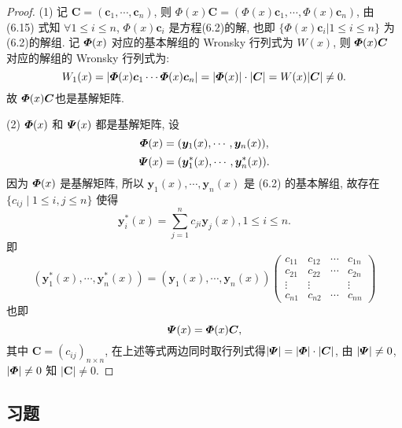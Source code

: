 \begin{proof}
(1) 记 $\bm{C}=(\bm{c}_1,\cdots,\bm{c}_n)$,
则 $\bm{\varPhi}(x)\bm{C}=(\bm{\varPhi}(x)\bm{c}_1,\cdots,\bm{\varPhi}(x)\bm{c}_n)$,
由 (6.15) 式知 $\forall 1\leq i\leq n$, $\bm{\varPhi}(x)\bm{c}_i$ 是方程(6.2)的解,
也即 $\{\bm{\varPhi}(x)\bm{c}_i|1\leq i\leq n\}$ 为(6.2)的解组.
记 $\bm{\varPhi}(x)$ 对应的基本解组的 Wronsky 行列式为 $W(x)$,
则 $\bm{\varPhi}(x)\bm{C}$ 对应的解组的 Wronsky 行列式为:
\[W_1(x) = |\bm{\varPhi}(x)\bm{c}_1\cdots\bm{\varPhi}(x)\bm{c}_n|
  = |\bm{\varPhi}(x)|\cdot|\bm{C}|=W(x)|\bm{C}|\neq 0.\]
故 $\bm{\varPhi}(x)\bm{C}$也是基解矩阵.

(2) $\bm{\varPhi}(x)$ 和 $\bm{\varPsi}(x)$ 都是基解矩阵, 设
\[\bm{\varPhi}(x)=(\bm{y}_1(x),\cdots,\bm{y}_n(x)),\]
\[\bm{\varPsi}(x)=(\bm{y}_1^*(x),\cdots,\bm{y}_n^*(x)).\]
因为 $\bm{\varPhi}(x)$ 是基解矩阵, 所以 $\bm{y}_1(x),\cdots,\bm{y}_n(x)$ 是 (6.2) 的基本解组, 
故存在 $\{c_{ij}\mid 1\leq i,j\leq n\}$ 使得
\[\bm{y}_i^*(x)=\sum_{j=1}^nc_{ji}\bm{y}_j(x),1\leq i\leq n.\]
即
\[(\bm{y}_1^*(x),\cdots,\bm{y}_n^*(x)) = (\bm{y}_1(x),\cdots,\bm{y}_n(x))
\begin{pmatrix}
  c_{11}&c_{12}&\cdots&c_{1n}\\
  c_{21}&c_{22}&\cdots&c_{2n}\\
  \vdots&\vdots&&\vdots\\
  c_{n1}&c_{n2}&\cdots&c_{nn}
\end{pmatrix}\]
也即
\[\bm{\varPsi}(x)=\bm{\varPhi}(x)\bm{C},\]
其中 $\bm{C}=(c_{ij})_{n\times n}$, 在上述等式两边同时取行列式得$|\bm{\varPsi}|=|\bm{\varPhi}|\cdot|\bm{C}|$, 
由 $|\bm{\varPsi}|\neq 0$, $|\bm{\varPhi}|\neq 0$ 知 $|\bm{C}|\neq 0$.
\end{proof}



\subsection{习题}



